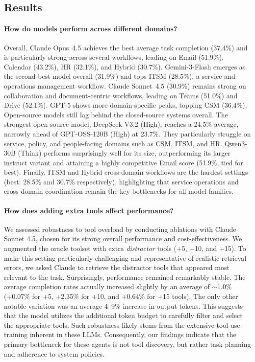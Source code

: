 \subsection{Results}

\paragraph{How do models perform across different domains?}
Overall, Claude Opus~4.5 achieves the best average task completion (37.4\%) and is particularly strong across several workflows, leading on Email (51.9\%), Calendar (43.2\%), HR (32.1\%), and Hybrid (30.7\%). Gemini-3-Flash emerges as the second-best model overall (31.9\%) and tops ITSM (28.5\%), a service and operations management workflow. Claude Sonnet~4.5 (30.9\%) remains strong on collaboration and document-centric workflows, leading on Teams (51.0\%) and Drive (52.1\%). GPT-5 shows more domain-specific peaks, topping CSM (36.4\%). Open-source models still lag behind the closed-source systems overall. The strongest open-source model, DeepSeek-V3.2 (High), reaches a 24.5\% average, narrowly ahead of GPT-OSS-120B (High) at 23.7\%. They particularly struggle on service, policy, and people-facing domains such as CSM, ITSM, and HR. Qwen3-30B (Think) performs surprisingly well for its size, outperforming its larger instruct variant and attaining a highly competitive Email score (51.9\%, tied for best). Finally, ITSM and Hybrid cross-domain workflows are the hardest settings (best: 28.5\% and 30.7\% respectively), highlighting that service operations and cross-domain coordination remain the key bottlenecks for all model families.

\paragraph{How does adding extra tools affect performance?}
We assessed robustness to tool overload by conducting ablations with Claude Sonnet 4.5, chosen for its strong overall performance and cost-effectiveness. We augmented the oracle toolset with extra \textit{distractor} tools (+5, +10, and +15). To make this setting particularly challenging and representative of realistic retrieval errors, we asked Claude to retrieve the distractor tools that appeared most relevant to the task. Surprisingly, performance remained remarkably stable. The average completion rates actually increased slightly by an average of $\sim$1.0\% (+0.07\% for +5, +2.35\% for +10, and +0.64\% for +15 tools). The only other notable variation was an average 4--9\% increase in output tokens. This suggests that the model utilizes the additional token budget to carefully filter and select the appropriate tools. Such robustness likely stems from the extensive tool-use training inherent in these LLMs. Consequently, our findings indicate that the primary bottleneck for these agents is not tool discovery, but rather task planning and adherence to system policies.

